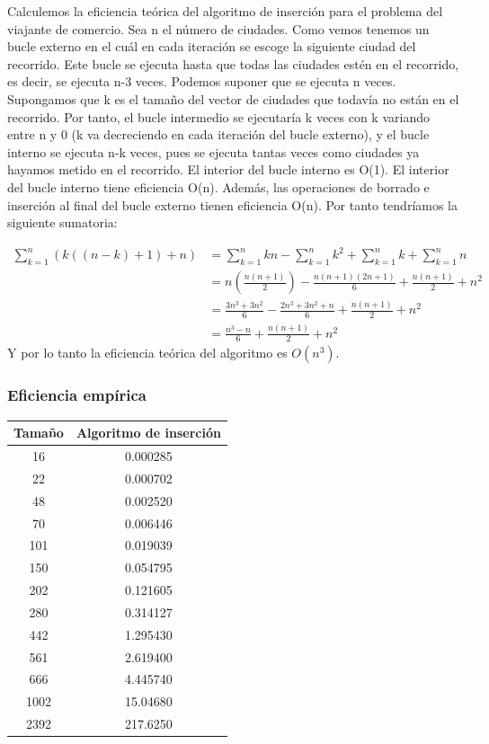 \documentclass[a4]{article}
\begin{document}
Calculemos la eficiencia teórica del algoritmo de inserción para el
problema del viajante de comercio. Sea n el número de ciudades. Como
vemos tenemos un bucle externo en el cuál en cada iteración se escoge
la siguiente ciudad del recorrido. Este bucle se ejecuta hasta que
todas las ciudades estén en el recorrido, es decir, se ejecuta n-3
veces. Podemos suponer que se ejecuta n veces. Supongamos que k es el
tamaño del vector de ciudades que todavía no están en el
recorrido. Por tanto, el bucle intermedio se ejecutaría k veces con k
variando entre n y 0 (k va decreciendo en cada iteración del bucle
externo), y el bucle interno se ejecuta n-k veces, pues se ejecuta
tantas veces como ciudades ya hayamos metido en el recorrido. El
interior del bucle interno es O(1). El interior del bucle interno
tiene eficiencia O(n). Además, las operaciones de borrado e inserción
al final del bucle externo tienen eficiencia O(n). Por tanto
tendríamos la siguiente sumatoria:

\begin{align*}
\sum_{k=1}^{n}(k((n-k)+1)+n)&=\sum_{k=1}^{n}kn-\sum_{k=1}^{n}k^2+\sum_{k=1}^{n}k+\sum_{k=1}^{n}n\\&=n(\frac{n(n+1)}{2})-\frac{n(n+1)(2n+1)}{6}+\frac{n(n+1)}{2}+n^2\\&=\frac{3n^3+3n^2}{6}-\frac{2n^3+3n^2+n}{6}+\frac{n(n+1)}{2}+n^2\\&=\frac{n^3-n}{6}+\frac{n(n+1)}{2}+n^2
\end{align*}
Y por lo tanto la eficiencia teórica del algoritmo es $O(n^3)$.

\subsubsection{Eficiencia empírica}

\begin{tabular}{|c|c|} \hline
\textbf{Tamaño}& 
\textbf{Algoritmo de inserción}
  \\ \hline
     16      & 0.000285  \\
     22      & 0.000702  \\
     48      & 0.002520  \\
     70      & 0.006446  \\
     101     & 0.019039            \\
     150     & 0.054795  \\
     202     & 0.121605  \\
     280     & 0.314127    \\
     442     & 1.295430    \\
     561     & 2.619400  \\
     666     & 4.445740       \\
     1002    & 15.04680  \\
     2392    & 217.6250   \\
\hline
\end{tabular}
\end{document}
